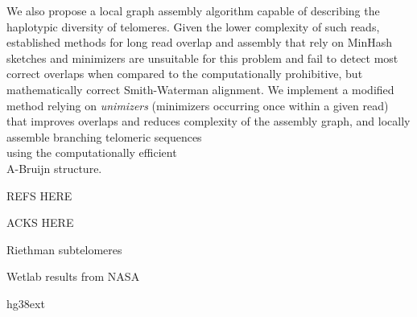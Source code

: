 \documentclass[paperwidth=42in,paperheight=47.75in,portrait]{baposter}
\begin{document}
\begin{poster}
{    We also propose a local graph assembly algorithm capable of describing the haplotypic diversity of telomeres. Given the lower complexity of such
    reads, established methods for long read overlap and assembly that rely on MinHash sketches and minimizers are unsuitable for this problem and fail
    to detect most correct overlaps when compared to the computationally prohibitive, but mathematically correct Smith-Waterman alignment.
    We implement a modified method relying on \textit{unimizers} (minimizers occurring once within a given read) that improves overlaps and reduces
    complexity of the assembly graph, and locally assemble branching telomeric sequences \\ using the computationally efficient \\ A-Bruijn structure.
}


{
    REFS HERE
    \vspace{1in}
%
%
}


{
    ACKS HERE
}


{
    \vspace{2in}
}


{
    Riethman subtelomeres
    \vspace{2in}
}


{
    Wetlab results from NASA
    \vspace{2in}
}


{
    hg38ext
    \vspace{2in}
}



\end{poster}
\end{document}
